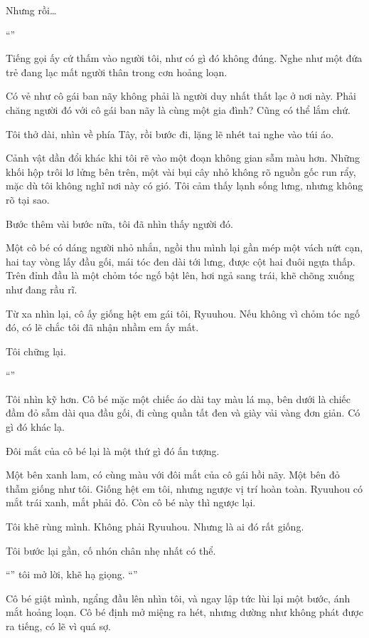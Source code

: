 \documentclass[../main.tex]{subfiles}
\begin{document}
Nhưng rồi\dots

``''

Tiếng gọi ấy cứ thấm vào người tôi, như có gì đó không đúng. Nghe như một đứa trẻ đang lạc mất người thân trong cơn hoảng loạn.

Có vẻ như cô gái ban nãy không phải là người duy nhất thất lạc ở nơi này. Phải chăng người đó với cô gái ban nãy là cùng một gia đình? Cũng có thể lắm chứ.

Tôi thở dài, nhìn về phía Tây, rồi bước đi, lặng lẽ nhét tai nghe vào túi áo.

\ct

Cảnh vật dần đổi khác khi tôi rẽ vào một đoạn không gian sẫm màu hơn. Những khối hộp trôi lơ lửng bên trên, một vài bụi cây nhỏ không rõ nguồn gốc run rẩy, mặc dù tôi không nghĩ nơi này có gió. Tôi cảm thấy lạnh sống lưng, nhưng không rõ tại sao.

Bước thêm vài bước nữa, tôi đã nhìn thấy người đó.

Một cô bé có dáng người nhỏ nhắn, ngồi thu mình lại gần mép một vách nứt cạn, hai tay vòng lấy đầu gối, mái tóc đen dài tới lưng, được cột hai đuôi ngựa thấp. Trên đỉnh đầu là một chỏm tóc ngố bật lên, hơi ngả sang trái, khẽ chõng xuống như đang rầu rĩ.

Từ xa nhìn lại, cô ấy giống hệt em gái tôi, Ryuuhou. Nếu không vì chỏm tóc ngố đó, có lẽ chắc tôi đã nhận nhầm em ấy mất.

Tôi chững lại.

``''

Tôi nhìn kỹ hơn. Cô bé mặc một chiếc áo dài tay màu lá mạ, bên dưới là chiếc đầm đỏ sẫm dài qua đầu gối, đi cùng quần tất đen và giày vải vàng đơn giản. Có gì đó khác lạ.

Đôi mắt của cô bé lại là một thứ gì đó ấn tượng.

Một bên xanh lam, có cùng màu với đôi mắt của cô gái hồi nãy. Một bên đỏ thẫm giống như tôi. Giống hệt em tôi, nhưng ngược vị trí hoàn toàn. Ryuuhou có mắt trái xanh, mắt phải đỏ. Còn cô bé này thì ngược lại.

Tôi khẽ rùng mình. Không phải Ryuuhou. Nhưng là ai đó rất giống.

Tôi bước lại gần, cố nhón chân nhẹ nhất có thể.

``'' tôi mở lời, khẽ hạ giọng. ``''

Cô bé giật mình, ngẩng đầu lên nhìn tôi, và ngay lập tức lùi lại một bước, ánh mắt hoảng loạn. Cô bé định mở miệng ra hét, nhưng dường như không phát được ra tiếng, có lẽ vì quá sợ.
\end{document}
